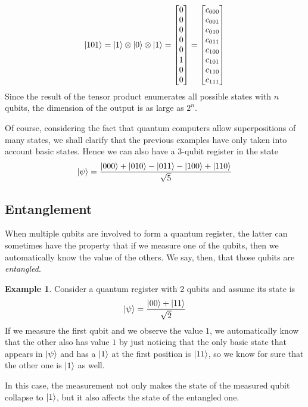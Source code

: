 \documentclass[12pt,a4paper]{report}
\theoremstyle{definition}
\theoremstyle{definition}
\newtheorem{example}{Example}[section]
\theoremstyle{definition}
\begin{document}
\begin{equation*}
    \ket{101}=\ket{1}\otimes\ket{0}\otimes\ket{1}=\begin{bmatrix}
        0\\
        0\\
        0\\
        0\\
        0\\
        1\\
        0\\
        0
    \end{bmatrix}=\begin{bmatrix}
        c_{000}\\
        c_{001}\\
        c_{010}\\
        c_{011}\\
        c_{100}\\
        c_{101}\\
        c_{110}\\
        c_{111}
    \end{bmatrix}
\end{equation*}
Since the result of the tensor product enumerates all possible states with $n$ qubits, the dimension of the output is as large as $2^n$.

Of course, considering the fact that quantum computers allow superpositions of many states, we shall clarify that the previous examples have only taken into account basic states. Hence we can also have a 3-qubit register in the state
\begin{equation*}
    \ket{\psi}=\frac{\ket{000}+\ket{010}-\ket{011}-\ket{100}+\ket{110}}{\sqrt{5}}
\end{equation*}



\subsection{Entanglement}
When multiple qubits are involved to form a quantum register, the latter can sometimes have the property that if we measure one of the qubits, then we automatically know the value of the others. We say, then, that those qubits are \textit{entangled}.
\begin{example}
Consider a quantum register with 2 qubits and assume its state is
\begin{equation*}
    \ket{\psi}=\frac{\ket{00}+\ket{11}}{\sqrt{2}}
\end{equation*}
If we measure the first qubit and we observe the value $1$, we automatically know that the other also has value $1$ by just noticing that the only basic state that appears in $\ket{\psi}$ and has a $\ket{1}$ at the first position is $\ket{11}$, so we know for sure that the other one is $\ket{1}$ as well.

In this case, the measurement not only makes the state of the measured qubit collapse to $\ket{1}$, but it also affects the state of the entangled one.
\end{example}
\end{document}
